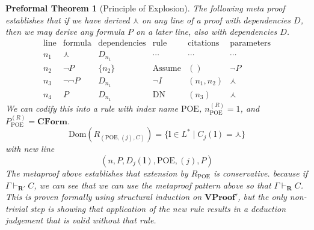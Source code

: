 \documentclass[oneside, 12pt]{book}
\theoremstyle{break}
\newtheorem{preformal definition}[definition]{Preformal Definition}
\newtheorem{preformal theorem}[theorem]{Preformal Theorem}
\newcommand{\bv}[1]{\boldsymbol{#1}}
\begin{document}
		\begin{preformal theorem}[Principle of Explosion]
			The following meta proof establishes that if we have derived $\curlywedge$ on any line of a proof with dependencies $D$, then we may derive any formula $P$ on a later line, also with dependencies $D$.
			\begin{equation*}
				\begin{array}{c|c|c|c|c|c}
					\text{line} & \text{formula} & \text{dependencies} & \text{rule} & \text{citations} & \text{parameters}\\ \hline
					n_1 & \curlywedge & D_{n_1} & \cdots & \cdots & \cdots\\
					n_2 & \lnot P & \{n_2\} & \text{Assume} & () & \lnot P\\
					n_3 & \lnot \lnot P & D_{n_1} & \lnot I & (n_1, n_2) & \curlywedge\\
					n_4 & P & D_{n_1} & \text{DN} & (n_3) & \curlywedge
				\end{array}
			\end{equation*}		
			We can codify this into a rule with index name $\text{POE}$, $n_{\text{POE}}^{(R)} = 1$, and $P_{\text{POE}}^{(R)} = \textbf{CForm}$.
			\begin{equation*}
				\text{Dom}(R_{(\text{POE}, (j), C)}) = \{\bv{l} \in L^* \mid C_j(\bv{l}) = \curlywedge\}
			\end{equation*}
			with new line
			\begin{equation*}
				(n, P, D_j(\bv{l}), \text{POE}, (j), P)
			\end{equation*}
			The metaproof above establishes that extension by $R_{\text{POE}}$ is conservative. because if $\Gamma \vdash_{\bv{R}'} C$, we can see that we can use the metaproof pattern above so that $\Gamma \vdash_{\bv{R}} C$. 
			This is proven formally using structural induction on $\textbf{VProof}'$, but the only non-trivial step is showing that application of the new rule results in a deduction judgement that is valid without that rule.
		\end{preformal theorem}
		
\end{document}
